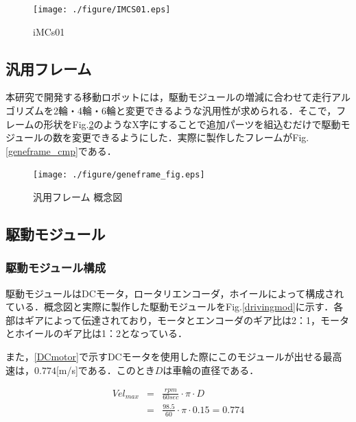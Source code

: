 \begin{figure}[hb]
	\centering
	\texttt{[image: ./figure/IMCS01.eps]}
	\caption{iMCs01}
	\label{iMCs01}
\end{figure}

\newpage
\subsection{汎用フレーム} \label{frame}
\par 本研究で開発する移動ロボットには，駆動モジュールの増減に合わせて走行アルゴリズムを2輪・4輪・6輪と変更できるような汎用性が求められる．そこで，フレームの形状をFig.\ref{geneframe_fig}のようなX字にすることで追加パーツを組込むだけで駆動モジュールの数を変更できるようにした．実際に製作したフレームがFig.\ref{geneframe_cmp}である．

\begin{figure}[hb]
	\centering
	\texttt{[image: ./figure/geneframe\_fig.eps]}
	\caption{汎用フレーム 概念図}
	\label{geneframe_fig}
\end{figure}





\newpage
\subsection{駆動モジュール} \label{module}
\subsubsection{駆動モジュール構成}
\par 駆動モジュールはDCモータ，ロータリエンコーダ，ホイールによって構成されている．概念図と実際に製作した駆動モジュールをFig.\ref{drivingmod}に示す．各部はギアによって伝達されており，モータとエンコーダのギア比は2：1，モータとホイールのギア比は1：2となっている．\\
\par また，\ref{DCmotor}で示すDCモータを使用した際にこのモジュールが出せる最高速は，$0.774$[m/s]である．このとき$D$は車輪の直径である．

\begin{eqnarray}
	Vel_{max}  &=&\frac{rpm}{60sec}\cdot \pi \cdot	D\\ \nonumber
	 &=&\frac{98.5}{60}\cdot \pi \cdot 0.15 = 0.774
\end{eqnarray}

